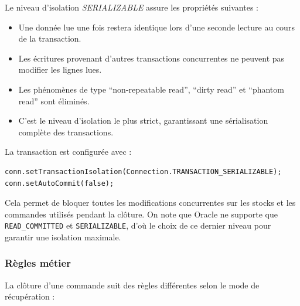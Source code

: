 Le niveau d'isolation \textit{SERIALIZABLE} assure les propriétés suivantes :

\begin{itemize}
    \item Une donnée lue une fois restera identique lors d'une seconde lecture au cours de la transaction.
    \item Les écritures provenant d'autres transactions concurrentes ne peuvent pas modifier les lignes lues.
    \item Les phénomènes de type ``non-repeatable read'', ``dirty read'' et ``phantom read'' sont éliminés.
    \item C'est le niveau d'isolation le plus strict, garantissant une sérialisation complète des transactions.
\end{itemize}

La transaction est configurée avec :

\begin{verbatim}
conn.setTransactionIsolation(Connection.TRANSACTION_SERIALIZABLE);
conn.setAutoCommit(false);
\end{verbatim}

Cela permet de bloquer toutes les modifications concurrentes sur les stocks et les commandes utilisés pendant la clôture. On note que Oracle ne supporte que \texttt{READ_COMMITTED} et \texttt{SERIALIZABLE}, d'où le choix de ce dernier niveau pour garantir une isolation maximale.

\subsubsection{Règles métier}

La clôture d'une commande suit des règles différentes selon le mode de récupération :

